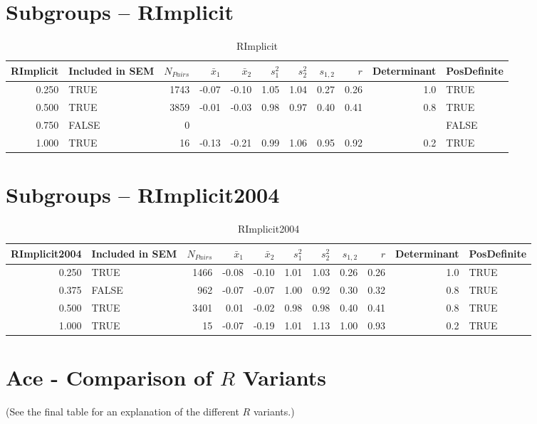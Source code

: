 \documentclass{article}\usepackage[]{graphicx}\usepackage[]{color}
\begin{document}
\section{Subgroups --  RImplicit }%
\begin{table}[ht]
\centering
\begin{tabular}{rlrrrrrrrrl}
  \hline
RImplicit & Included in SEM & $N_{Pairs}$ & $\bar{x}_1$ & $\bar{x}_2$ & $s_1^2$ & $s_2^2$ & $s_{1,2}$ & $r$ & Determinant & PosDefinite \\ 
  \hline
0.250 & TRUE & 1743 & -0.07 & -0.10 & 1.05 & 1.04 & 0.27 & 0.26 & 1.0 & TRUE \\ 
  0.500 & TRUE & 3859 & -0.01 & -0.03 & 0.98 & 0.97 & 0.40 & 0.41 & 0.8 & TRUE \\ 
  0.750 & FALSE & 0 &  &  &  &  &  &  &  & FALSE \\ 
  1.000 & TRUE & 16 & -0.13 & -0.21 & 0.99 & 1.06 & 0.95 & 0.92 & 0.2 & TRUE \\ 
   \hline
\end{tabular}
\caption{RImplicit} 
\end{table}
\section{Subgroups --  RImplicit2004 }%
\begin{table}[ht]
\centering
\begin{tabular}{rlrrrrrrrrl}
  \hline
RImplicit2004 & Included in SEM & $N_{Pairs}$ & $\bar{x}_1$ & $\bar{x}_2$ & $s_1^2$ & $s_2^2$ & $s_{1,2}$ & $r$ & Determinant & PosDefinite \\ 
  \hline
0.250 & TRUE & 1466 & -0.08 & -0.10 & 1.01 & 1.03 & 0.26 & 0.26 & 1.0 & TRUE \\ 
  0.375 & FALSE & 962 & -0.07 & -0.07 & 1.00 & 0.92 & 0.30 & 0.32 & 0.8 & TRUE \\ 
  0.500 & TRUE & 3401 & 0.01 & -0.02 & 0.98 & 0.98 & 0.40 & 0.41 & 0.8 & TRUE \\ 
  1.000 & TRUE & 15 & -0.07 & -0.19 & 1.01 & 1.13 & 1.00 & 0.93 & 0.2 & TRUE \\ 
   \hline
\end{tabular}
\caption{RImplicit2004} 
\end{table}


\section{Ace - Comparison of $R$ Variants} 
(See the final table for an explanation of the different $R$ variants.)
\end{document}
